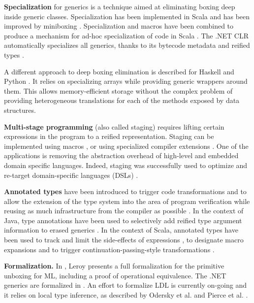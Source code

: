 \textbf{Specialization} for generics is a technique aimed at eliminating boxing deep inside generic classes. Specialization has been implemented in Scala \cite{iuli-thesis, specialization-iuli} and has been improved by miniboxing \cite{miniboxing, miniboxing-www}. Specialization and macros have been combined to produce a mechanism for ad-hoc specialization of code in Scala \cite{bridging}. The .NET CLR automatically specializes all generics, thanks to its bytecode metadata and reified types \cite{dot-net-generics}.

A different approach to deep boxing elimination is described for Haskell \cite{spj-dph} and Python \cite{bolz-python-strategies}. It relies on specializing arrays while providing generic wrappers around them. This allows memory-efficient storage without the complex problem of providing heterogeneous translations for each of the methods exposed by data structures.

\textbf{Multi-stage programming} (also called staging) \cite{taha-intro} requires lifting certain expressions in the program to a reified representation. Staging can be implemented using macros \cite{taha-macroml, eugene-macros, yin-yang}, or using specialized compiler extensions \cite{scala-virtualized}. One of the applications is removing the abstraction overhead of high-level and embedded domain specific languages. Indeed, staging was successfully used to optimize and re-target domain-specific languages (DSLs) \cite{tiark-thesis, tiark-lms, tiark-building-blocks, delite, nada-js, staged-sac}.

\textbf{Annotated types} \cite{sip-annotations, jsr-annotations} have been introduced to trigger code transformations and to allow the extension of the type system into the area of program verification while reusing as much infrastructure from the compiler as possible \cite{papi-annot-typechecker}. In the context of Java, type annotations have been used to selectively add reified type argument information to erased generics \cite{prodromos-refied-type-args}. In the context of Scala, annotated types have been used to track and limit the side-effects of expressions \cite{lukas-effects-ecoop, lukas-thesis}, to designate macro expansions \cite{eugene-macros} and to trigger continuation-passing-style transformations \cite{tiark-cps}.

\textbf{Formalization.} In \cite{leroy-unboxed-objects}, Leroy presents a full formalization for the primitive unboxing for ML, including a proof of operational equivalence. The .NET generics are formalized in \cite{dot-net-generics-form}. An effort to formalize LDL is currently on-going \cite{ldl-form} and it relies on local type inference, as described by Odersky et al. \cite{odersky-colored-local-type-inf} and Pierce et al. \cite{pierce-local-type-inference}.


